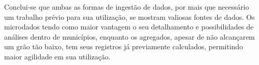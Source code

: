 Conclui-se que ambas as formas de ingestão de dados, por mais que necessário um trabalho prévio para sua utilização, se mostram valiosas fontes de dados. Os microdados tendo como maior vantagem o seu detalhamento e possibilidades de análises dentro de municípios, enquanto os agregados, apesar de não alcançarem um grão tão baixo, tem seus registros já previamente calculados, permitindo maior agilidade em sua utilização.


